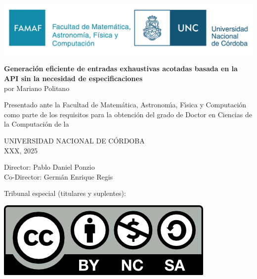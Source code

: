 \begin{titlepage}
\begin{center}

\begin{center}
{\includegraphics[scale=0.65]{images/logos.png}}
\end{center}
\medskip

{\LARGE \textbf{Generación eficiente de entradas exhaustivas acotadas basada en la API sin la necesidad de especificaciones}}\\ 
\vspace{1cm}
{\Large por Mariano Politano}\\\vspace{1cm}

{\large Presentado ante la Facultad de Matem\'atica, Astronom{\'\i}a, F{\'\i}sica y Computaci\'on como parte de los requisitos para la obtenci\'on del grado de Doctor en Ciencias de la Computación de la} \\ \vspace{1cm}

{\large UNIVERSIDAD NACIONAL DE C\'ORDOBA}\\ \vspace{1.5cm}
{\large  XXX, 2025}\\ \vspace{0.5cm} 

{\Large Director: Pablo Daniel Ponzio}
\\  \vspace{0.5cm} 
{\Large Co-Director: Germán Enrique Regis} \vspace{0.5cm} 

Tribunal especial (titulares y suplentes):

\end{center}

\begin{center}
\href{https://creativecommons.org/licenses/by-nc-sa/4.0/}{\includegraphics[scale=0.8]{images/by-nc-sa.png}}
\end{center}


\end{titlepage}
